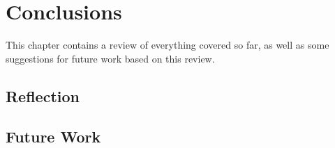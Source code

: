 \chapter{Conclusions}
  This chapter contains a review of everything covered so far, as well as some suggestions for future work based on this review.

  \section{Reflection}
  \section{Future Work}
